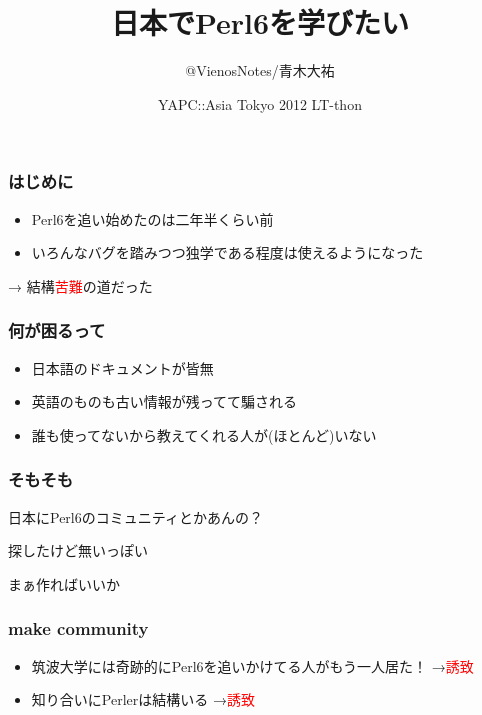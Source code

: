 \documentclass[14pt,dvipdfm,trans]{beamer}
\title{日本でPerl6を学びたい}
\author{@VienosNotes/青木大祐}
\institute{Tsukuba.pm}
\date{YAPC::Asia Tokyo 2012 LT-thon}
\begin{document}
\frame{\titlepage}

\begin{frame}
 \frametitle{はじめに}
 \begin{itemize}
  \item Perl6を追い始めたのは二年半くらい前
\vspace{1zh}
  \item いろんなバグを踏みつつ独学である程度は使えるようになった
 \end{itemize}
\vspace{2zh}
→ 結構\textcolor{red}{苦難}の道だった
\end{frame}

\begin{frame}
\frametitle{何が困るって}
\begin{itemize}
 \item 日本語のドキュメントが皆無
 \item 英語のものも古い情報が残ってて騙される
 \item 誰も使ってないから教えてくれる人が(ほとんど)いない
\end{itemize}
\end{frame}

\begin{frame}
 \frametitle{そもそも}
\begin{center}
 \large{日本にPerl6のコミュニティとかあんの？}
\end{center}
\end{frame}

\begin{frame}
 \begin{center}
  \huge{探したけど無いっぽい} 
 \end{center}
\end{frame}

\begin{frame}
\begin{center}
 \Huge{まぁ作ればいいか} 
\end{center}
\end{frame}

\begin{frame}
 \frametitle{make community}
\begin{itemize}
 \item 筑波大学には奇跡的にPerl6を追いかけてる人がもう一人居た！
       →\textcolor{red}{誘致}
\vspace{2zh}
 \item 知り合いにPerlerは結構いる →\textcolor{red}{誘致}
\end{itemize}


\end{frame}
\end{document}
